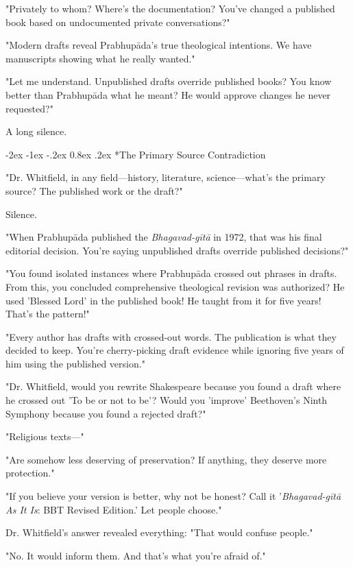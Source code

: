 \documentclass[12pt,twoside]{book}
\makeatletter
\let\oldsubsection\subsection
\renewcommand{\subsection}[1]{\needspace{3\baselineskip}\oldsubsection{#1}}
\renewcommand\subsection{\@startsection{subsection}{2}{\z@}%
{-2ex \@plus -1ex \@minus -.2ex}%
{0.8ex \@plus .2ex}%
{\normalfont\large\bfseries}}
\makeatother
\begin{document}
"Privately to whom? Where's the documentation? You've changed a published book based on undocumented private conversations?"

"Modern drafts reveal Prabhupāda's true theological intentions. We have manuscripts showing what he really wanted."

"Let me understand. Unpublished drafts override published books? You know better than Prabhupāda what he meant? He would approve changes he never requested?"

A long silence.

\vspace{0.1cm}
\subsection*{The Primary Source Contradiction}

"Dr. Whitfield, in any field—history, literature, science—what's the primary source? The published work or the draft?"

Silence.

"When Prabhupāda published the \emph{Bhagavad-gītā} in 1972, that was his final editorial decision. You're saying unpublished drafts override published decisions?"

"You found isolated instances where Prabhupāda crossed out phrases in drafts. From this, you concluded comprehensive theological revision was authorized? He used 'Blessed Lord' in the published book! He taught from it for five years! That's the pattern!"

"Every author has drafts with crossed-out words. The publication is what they decided to keep. You're cherry-picking draft evidence while ignoring five years of him using the published version."

"Dr. Whitfield, would you rewrite Shakespeare because you found a draft where he crossed out 'To be or not to be'? Would you 'improve' Beethoven's Ninth Symphony because you found a rejected draft?"

"Religious texts—"

"Are somehow less deserving of preservation? If anything, they deserve more protection."

"If you believe your version is better, why not be honest? Call it '\emph{Bhagavad-gītā As It Is}: BBT Revised Edition.' Let people choose."

Dr. Whitfield's answer revealed everything: "That would confuse people."

"No. It would inform them. And that's what you're afraid of."
\end{document}
